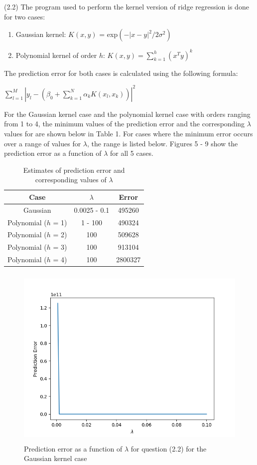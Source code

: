 (2.2) The program used to perform the kernel version of ridge regression is done for two cases:
\begin{enumerate}
    \item Gaussian kernel: $K(x, y)$ = exp$(-|x - y|^{2} / 2\sigma^{2})$
    \item Polynomial kernel of order $h$: $K(x, y) = \sum\limits_{k=1}^h (x^{T}y)^{k}$
\end{enumerate}
The prediction error for both cases is calculated using the following formula:
\begin{center}
    $\sum\limits_{l=1}^M|y_{l} - (\beta_{0} + \sum\limits_{k=1}^N\alpha_{k}K(x_{l}, x_{k}))|^{2}$
\end{center}
For the Gaussian kernel case and the polynomial kernel case with orders ranging from 1 to 4, the minimum values of the prediction error and the corresponding $\lambda$ values for are shown below in Table 1. For cases where the minimum error occurs over a range of values for $\lambda$, the range is listed below. Figures 5 - 9 show the prediction error as a function of $\lambda$ for all 5 cases.
\vspace{2cm}
\begin{table}[h!]
\centering
 \begin{tabular}{||c c c||} 
 \hline
 Case & $\lambda$ & Error \\ [0.5ex] 
 \hline\hline
Gaussian & 0.0025 - 0.1 & 495260 \\
Polynomial ($h$ = 1) & 1 - 100 & 490324 \\
Polynomial ($h$ = 2) & 100 & 509628 \\
Polynomial ($h$ = 3) & 100 & 913104 \\
Polynomial ($h$ = 4) & 100 & 2800327 \\ [1ex] 
 \hline
 \end{tabular}
 \caption{Estimates of prediction error and corresponding values of $\lambda$}
\label{table:1}
\end{table}
\begin{figure}[h!]
    \centering
    \includegraphics[height=3.5in]{Figure_5.png}
    \caption{Prediction error as a function of $\lambda$ for question (2.2) for the Gaussian kernel case}
\end{figure}
